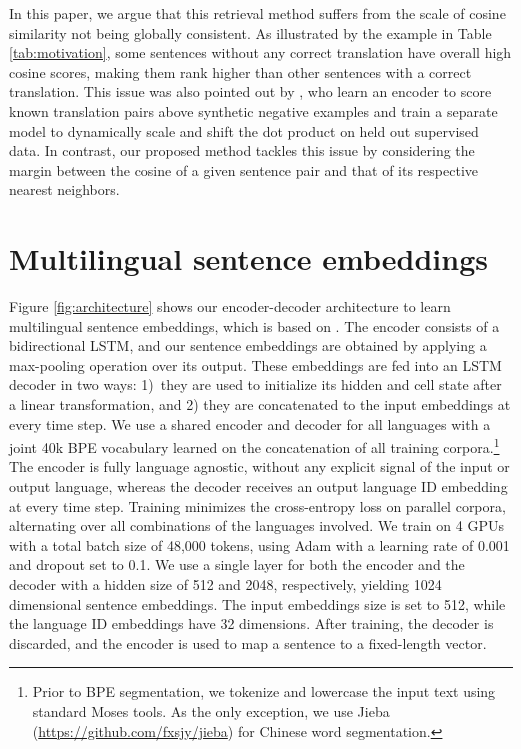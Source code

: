 \documentclass[11pt,a4paper]{article}
\begin{document}
\InsertExample

In this paper, we argue that this retrieval method suffers from the scale of cosine similarity not being globally consistent. As illustrated by the example in Table \ref{tab:motivation}, some sentences without any correct translation have overall high cosine scores, making them rank higher than other sentences with a correct translation. This issue was also pointed out by \citet{guo:2018:wmt_effective}, who learn an encoder to score known translation pairs above synthetic negative examples and train a separate model to dynamically scale and shift the dot product on held out supervised data. In contrast, our proposed method tackles this issue by considering the margin between the cosine of a given sentence pair and that of its respective  nearest neighbors.











\section{Multilingual sentence embeddings}
\label{sec:embeddings}


Figure \ref{fig:architecture} shows our encoder-decoder architecture to learn multilingual sentence embeddings, which is based on \citet{schwenk2018filtering}. The encoder consists of a bidirectional LSTM, and our sentence embeddings are obtained by applying a max-pooling operation over its output. These embeddings are fed into an LSTM decoder in two ways: 1)~they are used to initialize its hidden and cell state after a linear transformation, and 2) they are concatenated to the input embeddings at every time step. We use a shared encoder and decoder for all languages with a joint 40k BPE vocabulary learned on the concatenation of all training corpora.\footnote{Prior to BPE segmentation, we tokenize and lowercase the input text using standard Moses tools. As the only exception, we use Jieba (\url{https://github.com/fxsjy/jieba}) for Chinese word segmentation.} The encoder is fully language agnostic, without any explicit signal of the input or output language, whereas the decoder receives an output language ID embedding at every time step. Training minimizes the cross-entropy loss on parallel corpora, alternating over all combinations of the languages involved. We train on 4 GPUs with a total batch size of 48,000 tokens, using Adam with a learning rate of 0.001 and dropout set to 0.1. We use a single layer for both the encoder and the decoder with a hidden size of 512 and 2048, respectively, yielding 1024 dimensional sentence embeddings. The input embeddings size is set to 512, while the language ID embeddings have 32 dimensions. After training, the decoder is discarded, and the encoder is used to map a sentence to a fixed-length vector.
\end{document}
